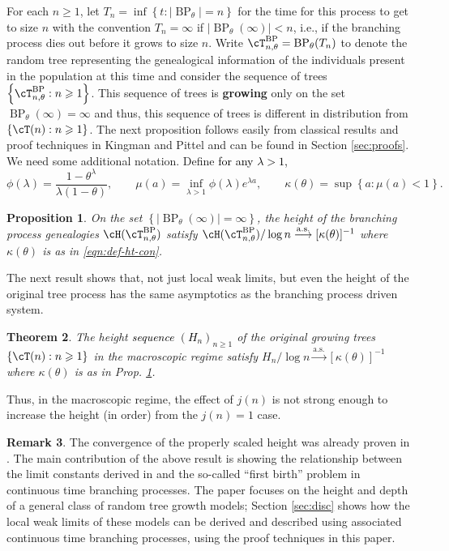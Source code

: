 \documentclass[letterpaper,11pt,reqno]{amsart}
\newtheorem{thm}{Theorem}[section]
\newtheorem{prop}[thm]{Proposition}
\theoremstyle{definition}
\newtheorem{rem}[thm]{Remark}
\renewcommand{\geq}{\geqslant}
\newcommand{\set}[1]{\left\{#1\right\}}
\newcommand{\convas}{\stackrel{\mathrm{a.s.}}{\longrightarrow}}
\DeclareMathOperator{\BP}{BP}
\newcommand\marginal[1]{\marginpar{\raggedright\parindent=0pt\tiny #1}}
\newcommand{\nmar}[1]{\textcolor{black}{\marginal{#1 \\ NM}}}
\begin{document}
For each $n\geq 1$, let $T_n = \inf\set{t: |\BP_{\theta}| = n}$ for the time for this process to get to size $n$ with the convention $T_n = \infty$ if $|\BP_\theta(\infty)| < n$, i.e., if the branching process dies out before it grows to size $n$. Write $\cT_{n,\theta}^{\BP} = \BP_{\theta}(T_n)$ to denote the random tree representing the genealogical information of the individuals present in the population at this time and consider the sequence of trees $\set{\cT_{n,\theta}^{\BP}: n\geq 1}$. This sequence of trees is {\bf growing} only on the set $\BP_\theta(\infty) = \infty$ and thus, this sequence of trees is different in distribution from $\set{\cT(n):n\geq 1}$. The next proposition follows easily from classical results and proof techniques in Kingman and Pittel \cites{kingman1975first,pittel1994note} and can be found in Section \ref{sec:proofs}. We need some additional notation. Define \textcolor{black}{for any $\lambda>1$,}
\begin{equation}
    \label{eqn:def-ht-con}
    \phi(\lambda) = \frac{1-\theta^\lambda}{\lambda(1-\theta)}, \qquad \mu(a) = \inf_{\lambda >1}{\phi(\lambda)e^{\lambda a}}, \qquad \kappa(\theta) = \sup\set{a: \mu(a) <1}. 
\end{equation}

\begin{prop}
\label{prop:bp-height}
  On the set $\set{|\BP_\theta(\infty)| = \infty}$,  the height of the branching process genealogies $\cH(\cT_{n,\theta}^{\BP})$ satisfy $\cH(\cT_{n,\theta}^{\BP})/\log{n} \convas [\kappa(\theta)]^{-1}$ where $\kappa(\theta) $ is as in \eqref{eqn:def-ht-con}. 
\end{prop}

The next result shows that, not just local weak limits, but even the height of the original tree process has the same asymptotics as the branching process driven system.  

\begin{thm}
\label{thm:ht-macro}
The height \textcolor{black}{sequence $(H_n)_{n \geq 1}$} of the original growing trees $\set{\cT(n):n\geq 1}$ in the macroscopic regime satisfy $H_n/\log{n} \convas [\kappa(\theta)]^{-1}$ where $\kappa(\theta)$ is as in Prop. \ref{prop:bp-height}.
\end{thm}
{Thus, in the macroscopic regime, the effect of $j(n)$ is not strong enough to increase the height (in order) from the $j(n)=1$ case.}


\begin{rem}
    The convergence of the properly scaled height was already proven in \cite{devroye2012depth}. The main contribution of the above result is showing the relationship between the limit constants derived in \cite{devroye2012depth} and the so-called ``first birth'' problem in continuous time branching processes. The paper \cite{devroye2012depth} focuses on the height and depth of a general class of random tree growth models;  Section \ref{sec:disc} shows how the local weak limits of these models can be derived  and described using associated continuous time branching processes, using the proof techniques in this paper. 
\end{rem}
\end{document}
